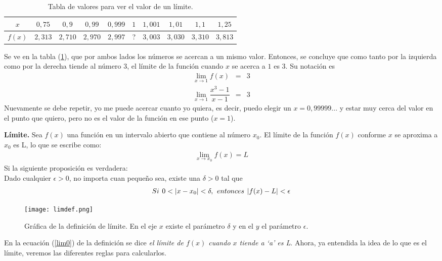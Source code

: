 \begin{table}[h!]
\begin{center}
 \begin{tabular}{|c|c|c|c|c|c|c|c|c|c|}
 \hline
 $x$&$0,75$&$0,9$&$0,99$&$0,999$&$1$&$1,001$&$1,01$&$1,1$&$1,25$\\
 \hline
 $f(x)$&$2,313$&$2,710$&$2,970$&$2,997$&?&$3,003$&$3,030$&$3,310$&$3,813$\\
 \hline
 \end{tabular}
 \caption{Tabla de valores para ver el valor de un límite.}
 \label{tablalim}
 \end{center}
\end{table}
Se ve en la tabla (\ref{tablalim}), que por ambos lados los números se acercan a un mismo valor. Entonces, se concluye que como tanto por la izquierda como por la derecha tiende al número $3$, el límite de la función cuando $x$ se acerca a $1$ es $3$. Su notación es
\begin{eqnarray*}
 \lim_{x\to 1 } f(x) &=&3\\
  \lim_{x\to 1 } \dfrac{x^{3}-1}{x-1} &=&3
\end{eqnarray*}
Nuevamente se debe repetir, yo me puede acercar cuanto yo quiera, es decir, puedo elegir un $x=0,99999...$ y estar muy cerca del valor en el punto que quiero, pero no es el valor de la función en ese punto ($x=1$).

\begin{mydef}
\textbf{Límite. }Sea $f(x)$ una función en un intervalo abierto que contiene al número $x_{0}$. El límite de la función $f(x)$ conforme $x$ se aproxima a $x_{0}$ es L, lo que se escribe como: 
\begin{eqnarray}
\lim_{x\rightarrow x_{0}}f(x)=L
\label{lim0}
\end{eqnarray}
Si la siguiente proposición es verdadera:\\
Dado cualquier $\epsilon>0$, no importa cuan pequeño sea, existe una $\delta>0$ tal que 
\begin{eqnarray*}
Si \hspace{4px} 0<|x-x_{0}|<\delta , \hspace{4px} entonces \hspace{4px} |f(x)-L|<\epsilon  
\end{eqnarray*}
\end{mydef}

 \begin{center}
\begin{figure}[h!]
\centering
\texttt{[image: limdef.png]}
\caption[Gráfica de la definición de límite.]{Gráfica de la definición de límite. En el eje $x$ existe el parámetro $\delta$ y en el $y$ el parámetro $\epsilon$.} \label{limdef0}
\end{figure}
\end{center}
\newpage
En la ecuación (\ref{lim0}) de la definición se dice \textit{el límite de $f(x)$ cuando $x$ tiende a `a' es L}. Ahora, ya entendida la idea de lo que es el límite, veremos las diferentes reglas para calcularlos.

